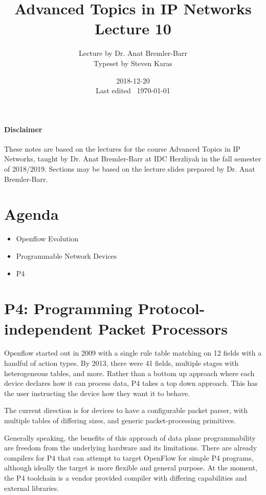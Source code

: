 \documentclass{idc_msc}
\title{Advanced Topics in IP Networks \\\large Lecture 10}
\date{2018-12-20 \\ Last edited \currenttime\ \today}
\author{Lecture by Dr. Anat Bremler-Barr\\Typeset by Steven Karas}
\begin{document}
\maketitle

\paragraph{Disclaimer}

These notes are based on the lectures for the course Advanced Topics in IP Networks, taught by Dr. Anat Bremler-Barr at IDC Herzliyah in the fall semester of 2018/2019.
Sections may be based on the lecture slides prepared by Dr. Anat Bremler-Barr.

\nocite{Varghese:2004:NAI:1203994}
\nocite{Crovella:2006:IMI:1196480}
\nocite{Kurose:2002:CNT:549735}

\section{Agenda}

\begin{itemize}
  \item Openflow Evolution
  \item Programmable Network Devices
  \item P4
\end{itemize}

\section{P4: Programming Protocol-independent Packet Processors}

Openflow started out in 2009 with a single rule table matching on 12 fields with a handful of action types.
By 2013, there were 41 fields, multiple stages with heterogeneous tables, and more.
Rather than a bottom up approach where each device declares how it can process data, P4 takes a top down approach.
This has the user instructing the device how they want it to behave.

The current direction is for devices to have a configurable packet parser, with multiple tables of differing sizes, and generic packet-processing primitives.

Generally speaking, the benefits of this approach of data plane programmability are freedom from the underlying hardware and its limitations.
There are already compilers for P4 that can attempt to target OpenFlow for simple P4 programs, although ideally the target is more flexible and general purpose.
At the moment, the P4 toolchain is a vendor provided compiler with differing capabilities and external libraries.
\end{document}

